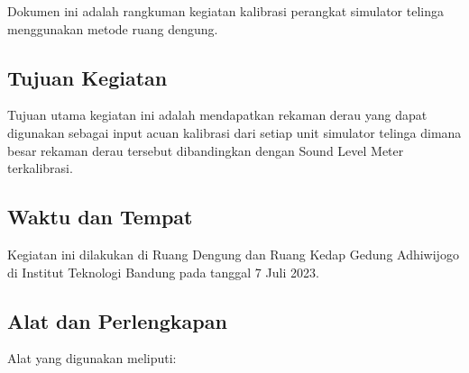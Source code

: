 \documentclass{article}
\begin{document}
	Dokumen ini adalah rangkuman kegiatan kalibrasi perangkat simulator telinga menggunakan metode ruang dengung.

	\subsection{Tujuan Kegiatan}

	Tujuan utama kegiatan ini adalah mendapatkan rekaman derau yang dapat digunakan sebagai input acuan kalibrasi
	dari setiap unit simulator telinga dimana besar rekaman derau tersebut dibandingkan dengan Sound Level Meter terkalibrasi.

	\subsection{Waktu dan Tempat}

	Kegiatan ini dilakukan di Ruang Dengung dan Ruang Kedap Gedung Adhiwijogo di Institut Teknologi Bandung pada tanggal 7 Juli 2023.

	\subsection{Alat dan Perlengkapan}

	Alat yang digunakan meliputi:
\end{document}
